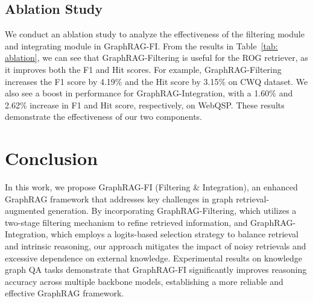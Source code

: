 \documentclass[11pt]{article}
\begin{document}
\subsection{Ablation Study}
\label{sec:ablation}
We conduct an ablation study to analyze the effectiveness of the filtering module and integrating module in GraphRAG-FI. From the results in Table~\ref{tab: ablation}, we can see that GraphRAG-Filtering is useful for the ROG retriever, as it improves both the F1 and Hit scores. For example, GraphRAG-Filtering increases the F1 score by 4.19\%  and the Hit score by 3.15\% on CWQ dataset. We also see a boost in performance for GraphRAG-Integration, with a 1.60\% and 2.62\% increase in F1 and Hit score, respectively, on WebQSP. These results demonstrate the effectiveness of our two components.
\begin{table}[h]
    \centering
\caption{Ablation study.}   \label{tab: ablation}

\end{table}

\section{Conclusion}
In this work, we propose GraphRAG-FI (Filtering \& Integration), an enhanced GraphRAG framework that addresses key challenges in graph retrieval-augmented generation. By incorporating GraphRAG-Filtering, which utilizes a two-stage filtering mechanism to refine retrieved information, and GraphRAG-Integration, which employs a logits-based selection strategy to balance retrieval and intrinsic reasoning, our approach mitigates the impact of noisy retrievals and excessive dependence on external knowledge. Experimental results on knowledge graph QA tasks demonstrate that GraphRAG-FI significantly improves reasoning accuracy across multiple backbone models, establishing a more reliable and effective GraphRAG framework.
\clearpage
\end{document}

